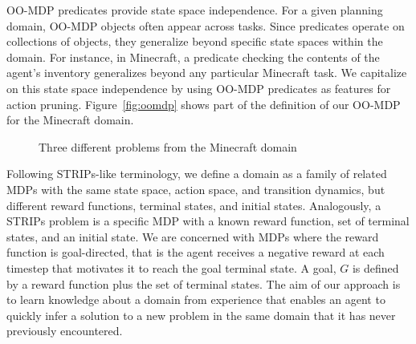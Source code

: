 \documentclass[letterpaper]{article}
\begin{document}
OO-MDP predicates provide state space independence. For a given
planning domain, OO-MDP objects often appear across tasks. Since
predicates operate on collections of objects, they generalize beyond
specific state spaces within the domain.  For instance, in Minecraft,
a predicate checking the contents of the agent's inventory generalizes
beyond any particular Minecraft task. We capitalize on this state
space independence by using OO-MDP predicates as features for action
pruning.  Figure~\ref{fig:oomdp} shows part of the definition of our
OO-MDP for the Minecraft domain.

\begin{figure}[b]
\centering
{}
  \caption{Three different problems from the Minecraft domain}
  \label{fig:minecraft}
\end{figure}

Following STRIPs-like terminology, we define a domain as a family of
related MDPs with the same state space, action space, and transition
dynamics, but different reward functions, terminal states, and initial
states.  Analogously, a
STRIPs problem is a specific MDP with a known reward function, set
of terminal states, and an initial state.  We are
concerned with MDPs where the reward function is goal-directed, that
is the agent receives a negative reward at each timestep that motivates
it to reach the goal terminal state.  A goal, $G$ is
defined by a reward function plus the set of terminal states.  The aim
of our approach is to learn knowledge about a domain from experience
that enables an agent to quickly infer a solution to a new problem in
the same domain that it has never previously encountered.
\end{document}
